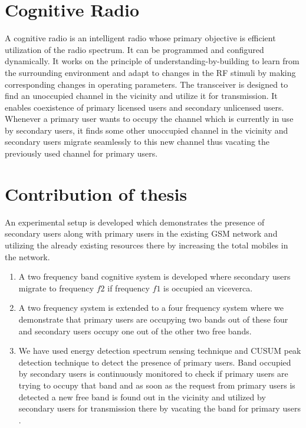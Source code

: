 \section{Cognitive Radio}
A cognitive radio is an intelligent radio whose primary objective is efficient
utilization of the radio spectrum. It can be programmed and configured 
dynamically. It works on the principle of understanding-by-building to learn 
from the surrounding environment and adapt to changes in the RF stimuli by 
making corresponding changes in operating parameters. The transceiver is 
designed to find an unoccupied channel in the vicinity and utilize it for 
transmission. It enables coexistence of primary licensed users and secondary 
unlicensed users. Whenever a primary user wants to occupy the channel which is
currently in use by secondary users, it finds some other unoccupied channel in
the vicinity and secondary users migrate seamlessly to this new channel thus 
vacating the previously used channel for primary users.  

\section{Contribution of thesis}
An experimental setup is developed which demonstrates the presence of 
secondary users along with primary users in the existing GSM network and 
utilizing the already existing resources there by increasing the total 
mobiles in the network.
\begin{enumerate}
  \item A two frequency band cognitive system is developed where secondary 
  users migrate to frequency $f2$ if frequency $f1$ is occupied an viceverca.
  \item A two frequency system is extended to a four frequency system where 
  we demonstrate that primary users are occupying two bands out of these four
  and secondary users occupy one out of the other two free bands.
  \item We have used energy detection spectrum sensing technique and CUSUM
  peak detection technique to detect the presence of primary users. Band 
  occupied by secondary users is continuously monitored to check if primary 
  users are trying to occupy that band and as soon as the request from primary
  users is detected a new free band is found out in the vicinity and utilized 
  by secondary users for transmission there by vacating the band for primary 
  users . 
\end{enumerate}

